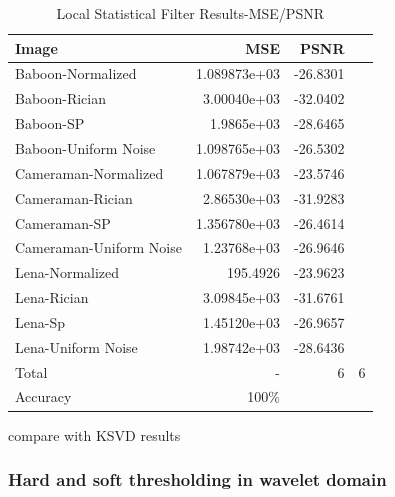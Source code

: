 \begin{table}[H]
\begin{center}
\begin{tabular}{l | r r r}
Image & MSE & PSNR\\
\hline
Baboon-Normalized & 1.089873e+03 &  -26.8301\\
Baboon-Rician &  3.00040e+03 & -32.0402\\
Baboon-SP & 1.9865e+03 & -28.6465 \\
Baboon-Uniform Noise & 1.098765e+03 & -26.5302\\
Cameraman-Normalized & 1.067879e+03 & -23.5746\\
Cameraman-Rician & 2.86530e+03 & -31.9283\\
Cameraman-SP & 1.356780e+03 &  -26.4614\\
Cameraman-Uniform Noise & 1.23768e+03 & -26.9646\\
Lena-Normalized & 195.4926 & -23.9623\\
Lena-Rician & 3.09845e+03 & -31.6761\\
Lena-Sp & 1.45120e+03 & -26.9657\\
Lena-Uniform Noise &  1.98742e+03 & -28.6436\\
\hline
Total & - & 6 & 6 \\
Accuracy & 100\% \\
\end{tabular}
\end{center}
\caption{Local Statistical Filter Results-MSE/PSNR}
\label{LS}
\end{table}

compare with KSVD results

\subsubsection{Hard and soft thresholding in wavelet domain}

